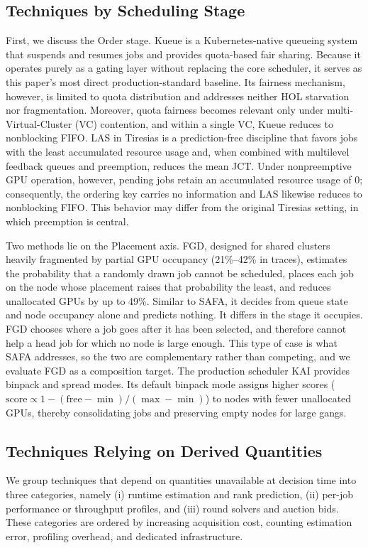 \documentclass{ieeetj}
\begin{document}
\subsection{Techniques by Scheduling Stage}
First, we discuss the Order stage. Kueue\cite{kueue2024} is a Kubernetes-native queueing system that suspends and resumes jobs and provides quota-based fair sharing. Because it operates purely as a gating layer without replacing the core scheduler, it serves as this paper's most direct production-standard baseline. Its fairness mechanism, however, is limited to quota distribution and addresses neither HOL starvation nor fragmentation. Moreover, quota fairness becomes relevant only under multi-Virtual-Cluster (VC) contention, and within a single VC, Kueue reduces to nonblocking FIFO. LAS in Tiresias\cite{gu2019tiresias} is a prediction-free discipline that favors jobs with the least accumulated resource usage and, when combined with multilevel feedback queues and preemption, reduces the mean JCT. Under nonpreemptive GPU operation, however, pending jobs retain an accumulated resource usage of 0; consequently, the ordering key carries no information and LAS likewise reduces to nonblocking FIFO. This behavior may differ from the original Tiresias setting, in which preemption is central.

Two methods lie on the Placement axis. FGD\cite{weng2023beware}, designed for shared clusters heavily fragmented by partial GPU occupancy (21\%--42\% in traces), estimates the probability that a randomly drawn job cannot be scheduled, places each job on the node whose placement raises that probability the least, and reduces unallocated GPUs by up to 49\%. Similar to SAFA, it decides from queue state and node occupancy alone and predicts nothing. It differs in the stage it occupies. FGD chooses where a job goes after it has been selected, and therefore cannot help a head job for which no node is large enough. This type of case is what SAFA addresses, so the two are complementary rather than competing, and we evaluate FGD as a composition target. The production scheduler KAI\cite{kai2025} provides binpack and spread modes. Its default binpack mode assigns higher scores ($\text{score}\propto 1-(\text{free}-\min)/(\max-\min)$) to nodes with fewer unallocated GPUs, thereby consolidating jobs and preserving empty nodes for large gangs.

\subsection{Techniques Relying on Derived Quantities}
We group techniques that depend on quantities unavailable at decision time into three categories, namely (i) runtime estimation and rank prediction, (ii) per-job performance or throughput profiles, and (iii) round solvers and auction bids. These categories are ordered by increasing acquisition cost, counting estimation error, profiling overhead, and dedicated infrastructure.
\end{document}
